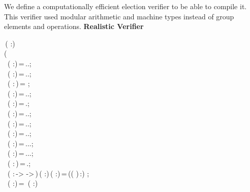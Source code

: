 We define a computationally efficient election verifier to be able to compile it.
This verifier used modular arithmetic and machine types instead of group elements and operations.
\textbf{Realistic Verifier}
\begin{holmath}
    \,( :)\,\HOLSymConst{\HOLTokenEquiv{}}\\
(\\
\,\,\,( :)\,=\,..;\\
\,\,\,( :)\,=\,..;\\
\,\,\,( :\,)\,=\,\,;\\
\,\,\,( :)\,=\,..;\\
\,\,\,( :)\,=\,.;\\
\,\,\,( :)\,=\,..;\\
\,\,\,( :)\,=\,..;\\
\,\,\,( :)\,=\,..;\\
\,\,\,( :)\,=\,...;\\
\,\,\,( :)\,=\,...;\\
\,\,\,( :\,)\,=\,.;\\
\,\,\,( :\,->\,\,->\,)\,( :)\,( :)\,=\,((\,\HOLSymConst{\HOLTokenProd{}}\,)\,:)\,\,;\\
\,\,\,(\HOLBoundVar{\ensuremath{\alpha}} :)\,=\,\,\,( :)\,\\

\end{holmath}
